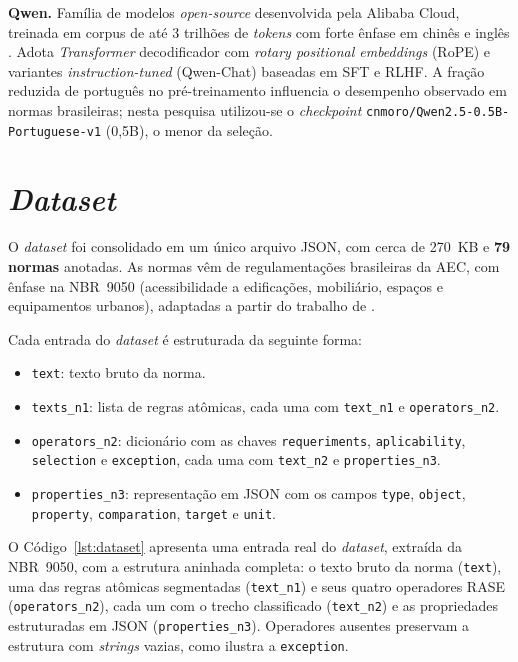 \textbf{Qwen.} Família de modelos \textit{open-source} desenvolvida pela Alibaba Cloud, treinada em corpus de até 3 trilhões de \textit{tokens} com forte ênfase em chinês e inglês \cite{qwen2023}. Adota \textit{Transformer} decodificador com \textit{rotary positional embeddings} (RoPE) e variantes \textit{instruction-tuned} (Qwen-Chat) baseadas em SFT e RLHF. A fração reduzida de português no pré-treinamento influencia o desempenho observado em normas brasileiras; nesta pesquisa utilizou-se o \textit{checkpoint} \texttt{cnmoro/Qwen2.5-0.5B-Portuguese-v1} (0,5B), o menor da seleção.

\section{\textit{Dataset}}

O \textit{dataset} foi consolidado em um único arquivo JSON, com cerca de 270~KB e \textbf{79 normas} anotadas. As normas vêm de regulamentações brasileiras da AEC, com ênfase na NBR~9050 \cite{abnt9050} (acessibilidade a edificações, mobiliário, espaços e equipamentos urbanos), adaptadas a partir do trabalho de .

Cada entrada do \textit{dataset} é estruturada da seguinte forma:

\begin{itemize}
    \item \texttt{text}: texto bruto da norma.
    \item \texttt{texts\_n1}: lista de regras atômicas, cada uma com \texttt{text\_n1} e \texttt{operators\_n2}.
    \item \texttt{operators\_n2}: dicionário com as chaves \texttt{requeriments}, \texttt{aplicability}, \texttt{selection} e \texttt{exception}, cada uma com \texttt{text\_n2} e \texttt{properties\_n3}.
    \item \texttt{properties\_n3}: representação em JSON com os campos \texttt{type}, \texttt{object}, \texttt{property}, \texttt{comparation}, \texttt{target} e \texttt{unit}.
\end{itemize}

O Código~\ref{lst:dataset} apresenta uma entrada real do \textit{dataset}, extraída da NBR~9050, com a estrutura aninhada completa: o texto bruto da norma (\texttt{text}), uma das regras atômicas segmentadas (\texttt{text\_n1}) e seus quatro operadores RASE (\texttt{operators\_n2}), cada um com o trecho classificado (\texttt{text\_n2}) e as propriedades estruturadas em JSON (\texttt{properties\_n3}). Operadores ausentes preservam a estrutura com \textit{strings} vazias, como ilustra a \texttt{exception}.

